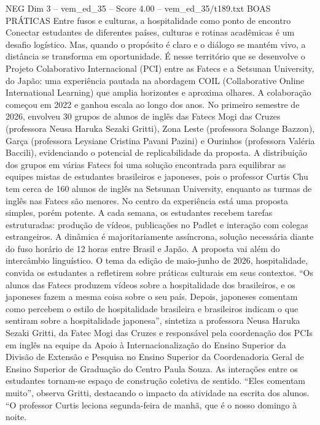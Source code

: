 \begin{textsample}{NEG Dim 3 – vem\_ed\_35 – Score 4.00 – vem\_ed\_35/t189.txt}  \label{ex:f3_neg_134}
BOAS PRÁTICAS Entre fusos e culturas, a hospitalidade como ponto de encontro Conectar estudantes de diferentes países, culturas e rotinas acadêmicas é um desafio logístico.
Mas, quando o propósito é claro e o diálogo se mantém vivo, a distância se transforma em oportunidade.
É nesse território que se desenvolve o Projeto Colaborativo Internacional (PCI) entre as Fatecs e a Setsunan University, do Japão: uma experiência pautada na abordagem COIL (Collaborative Online International Learning) que amplia horizontes e aproxima olhares.
A colaboração começou em 2022 e ganhou escala ao longo dos anos.
No primeiro semestre de 2026, envolveu 30 grupos de alunos de inglês das Fatecs Mogi das Cruzes (professora Neusa Haruka Sezaki Gritti), Zona Leste (professora Solange Bazzon), Garça (professora Leysiane Cristina Pavani Pazini) e Ourinhos (professora Valéria Baccili), evidenciando o potencial de replicabilidade da proposta.
A distribuição dos grupos em várias Fatecs foi uma solução encontrada para equilibrar as equipes mistas de estudantes brasileiros e japoneses, pois o professor Curtis Chu tem cerca de 160 alunos de inglês na Setsunan University, enquanto as turmas de inglês nas Fatecs são menores.
No centro da experiência está uma proposta simples, porém potente.
A cada semana, os estudantes recebem tarefas estruturadas: produção de vídeos, publicações no Padlet e interação com colegas estrangeiros.
A dinâmica é majoritariamente assíncrona, solução necessária diante do fuso horário de 12 horas entre Brasil e Japão.
A proposta vai além do intercâmbio linguístico.
O tema da edição de maio-junho de 2026, hospitalidade, convida os estudantes a refletirem sobre práticas culturais em seus contextos. “Os alunos das Fatecs produzem vídeos sobre a hospitalidade dos brasileiros, e os japoneses fazem a mesma coisa sobre o seu país.
Depois, japoneses comentam como percebem o estilo de hospitalidade brasileira e brasileiros indicam o que sentiram sobre a hospitalidade japonesa”, sintetiza a professora Neusa Haruka Sezaki Gritti, da Fatec Mogi das Cruzes e responsável pela coordenação dos PCIs em inglês na equipe da Apoio à Internacionalização do Ensino Superior da Divisão de Extensão e Pesquisa no Ensino Superior da Coordenadoria Geral de Ensino Superior de Graduação do Centro Paula Souza.
As interações entre os estudantes tornam-se espaço de construção coletiva de sentido. “Eles comentam muito”, observa Gritti, destacando o impacto da atividade na escrita dos alunos. “O professor Curtis leciona segunda-feira de manhã, que é o nosso domingo à noite.

\end{textsample}
